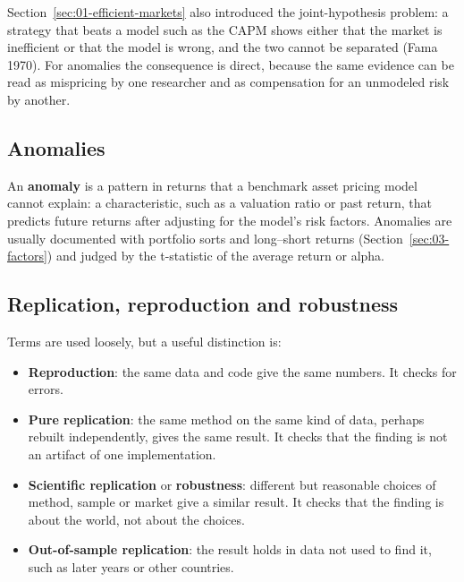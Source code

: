 Section~\ref{sec:01-efficient-markets} also introduced the joint-hypothesis problem: a strategy that beats a model such as the CAPM shows either that the market is inefficient or that the model is wrong, and the two cannot be separated (Fama 1970). For anomalies the consequence is direct, because the same evidence can be read as mispricing by one researcher and as compensation for an unmodeled risk by another.

\subsection{Anomalies}

An \textbf{anomaly} is a pattern in returns that a benchmark asset pricing model cannot explain: a characteristic, such as a valuation ratio or past return, that predicts future returns after adjusting for the model's risk factors. Anomalies are usually documented with portfolio sorts and long--short returns (Section~\ref{sec:03-factors}) and judged by the t-statistic of the average return or alpha.

\subsection{Replication, reproduction and robustness}

Terms are used loosely, but a useful distinction is:

\begin{itemize}
  \item \textbf{Reproduction}: the same data and code give the same numbers. It checks for errors.
  \item \textbf{Pure replication}: the same method on the same kind of data, perhaps rebuilt independently, gives the same result. It checks that the finding is not an artifact of one implementation.
  \item \textbf{Scientific replication} or \textbf{robustness}: different but reasonable choices of method, sample or market give a similar result. It checks that the finding is about the world, not about the choices.
  \item \textbf{Out-of-sample replication}: the result holds in data not used to find it, such as later years or other countries.
\end{itemize}

